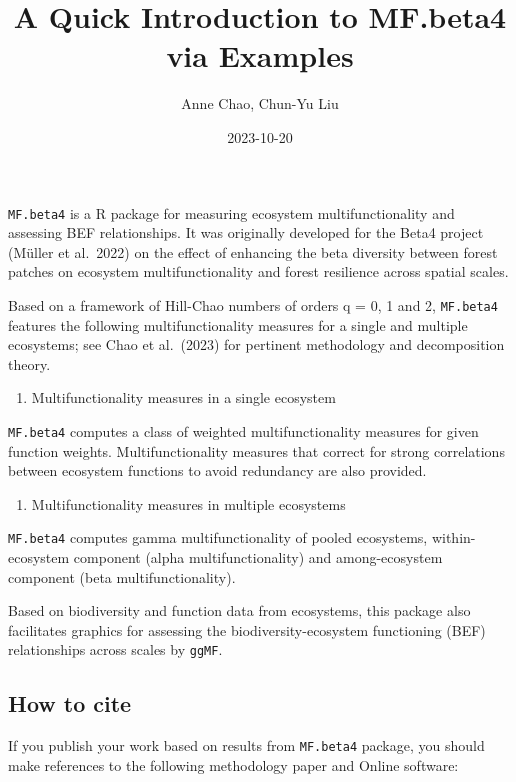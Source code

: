 \documentclass[
]{article}
\title{A Quick Introduction to MF.beta4 via Examples}
\author{Anne Chao, Chun-Yu Liu}
\date{2023-10-20}
\providecommand{\tightlist}{%
  \setlength{\itemsep}{0pt}\setlength{\parskip}{0pt}}
\begin{document}
\maketitle

\texttt{MF.beta4} is a R package for measuring ecosystem
multifunctionality and assessing BEF relationships. It was originally
developed for the Beta4 project (Müller et al.~2022) on the effect of
enhancing the beta diversity between forest patches on ecosystem
multifunctionality and forest resilience across spatial scales.

Based on a framework of Hill-Chao numbers of orders q = 0, 1 and 2,
\texttt{MF.beta4} features the following multifunctionality measures for
a single and multiple ecosystems; see Chao et al.~(2023) for pertinent
methodology and decomposition theory.

\begin{enumerate}
\def\labelenumi{(\arabic{enumi})}
\tightlist
\item
  Multifunctionality measures in a single ecosystem
\end{enumerate}

\texttt{MF.beta4} computes a class of weighted multifunctionality
measures for given function weights. Multifunctionality measures that
correct for strong correlations between ecosystem functions to avoid
redundancy are also provided.

\begin{enumerate}
\def\labelenumi{(\arabic{enumi})}
\setcounter{enumi}{1}
\tightlist
\item
  Multifunctionality measures in multiple ecosystems
\end{enumerate}

\texttt{MF.beta4} computes gamma multifunctionality of pooled
ecosystems, within-ecosystem component (alpha multifunctionality) and
among-ecosystem component (beta multifunctionality).

Based on biodiversity and function data from ecosystems, this package
also facilitates graphics for assessing the biodiversity-ecosystem
functioning (BEF) relationships across scales by \texttt{ggMF}.

\hypertarget{how-to-cite}{%
\subsection{How to cite}\label{how-to-cite}}

If you publish your work based on results from \texttt{MF.beta4}
package, you should make references to the following methodology paper
and Online software:
\end{document}
